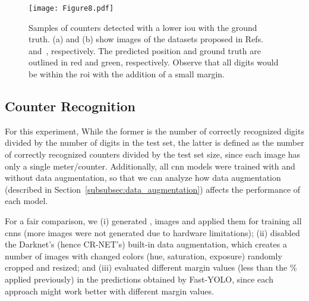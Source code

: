 

\begin{figure}
    \begin{center}
	\texttt{[image: Figure8.pdf]}
	\end{center}	
	\vspace{-3mm} 
    \caption{Samples of counters detected with a lower \gls*{iou} with the ground truth. (a) and (b) show images of the datasets proposed in Refs.~ and~, respectively. The predicted position and ground truth are outlined in red and green, respectively. Observe that all digits would be within the \gls*{roi} with the addition of a small margin.}
    \label{fig:detection_public_lower_iou}
\end{figure}

\subsection{Counter Recognition}
\label{subsec:results_recognition}

For this experiment,  While the former is the number of correctly recognized digits divided by the number of digits in the test set, the latter is defined as the number of correctly recognized counters divided by the test set size, since each image has only a single meter/counter. 
Additionally, all \gls*{cnn} models were trained with and without data augmentation, so that we can analyze how data augmentation (described in Section~\ref{subsubsec:data_augmentation}) affects the performance of each model.

For a fair comparison, we (i) generated , images and applied them for training all \glspl*{cnn} (more images were not generated due to hardware limitations); (ii) disabled the Darknet’s (hence CR-NET’s) built-in data augmentation, which creates a number of images with changed colors (hue, saturation, exposure) randomly cropped and resized; and (iii) evaluated different margin values (less than the \% applied previously) in the predictions obtained by Fast-YOLO, since each approach might work better with different margin values.

